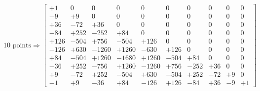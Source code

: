 \documentclass{amsart}
\begin{document}
  \begin{equation*}
    \text{10 points} \Rightarrow
    \begin{bmatrix}
        +1 &    0 &     0 &     0 &     0 &    0 &    0 &   0 &  0 &  0 \\
        -9 &   +9 &     0 &     0 &     0 &    0 &    0 &   0 &  0 &  0 \\
       +36 &  -72 &   +36 &     0 &     0 &    0 &    0 &   0 &  0 &  0 \\
       -84 & +252 &  -252 &   +84 &     0 &    0 &    0 &   0 &  0 &  0 \\
      +126 & -504 &  +756 &  -504 &  +126 &    0 &    0 &   0 &  0 &  0 \\
      -126 & +630 & -1260 & +1260 &  -630 & +126 &    0 &   0 &  0 &  0 \\
       +84 & -504 & +1260 & -1680 & +1260 & -504 &  +84 &   0 &  0 &  0 \\
       -36 & +252 &  -756 & +1260 & -1260 & +756 & -252 & +36 &  0 &  0 \\
        +9 &  -72 &  +252 &  -504 &  +630 & -504 & +252 & -72 & +9 &  0 \\
        -1 &   +9 &   -36 &   +84 &  -126 & +126 &  -84 & +36 & -9 & +1
    \end{bmatrix}
  \end{equation*}
\end{document}
